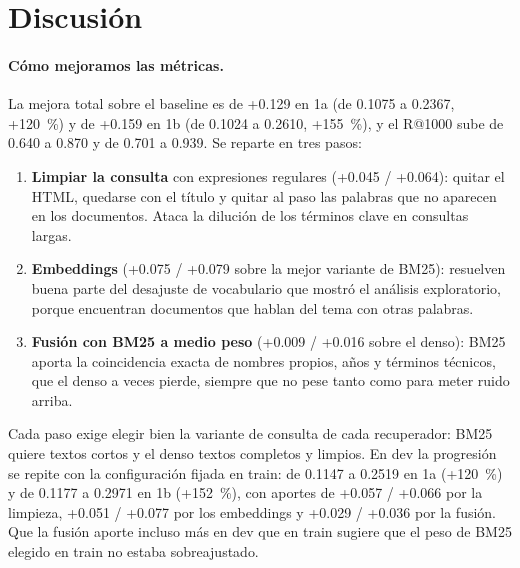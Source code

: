 \documentclass[11pt,a4paper]{article}
\begin{document}
\section{Discusión}
\label{sec:discusion}

\paragraph{Cómo mejoramos las métricas.} La mejora total sobre el baseline es de +0.129 en 1a (de 0.1075 a 0.2367, +120~\%) y de +0.159 en 1b (de 0.1024 a 0.2610, +155~\%), y el R@1000 sube de 0.640 a 0.870 y de 0.701 a 0.939. Se reparte en tres pasos:
\begin{enumerate}
  \item \textbf{Limpiar la consulta} con expresiones regulares (+0.045 / +0.064): quitar el HTML, quedarse con el título y quitar al paso las palabras que no aparecen en los documentos. Ataca la dilución de los términos clave en consultas largas.
  \item \textbf{Embeddings} (+0.075 / +0.079 sobre la mejor variante de BM25): resuelven buena parte del desajuste de vocabulario que mostró el análisis exploratorio, porque encuentran documentos que hablan del tema con otras palabras.
  \item \textbf{Fusión con BM25 a medio peso} (+0.009 / +0.016 sobre el denso): BM25 aporta la coincidencia exacta de nombres propios, años y términos técnicos, que el denso a veces pierde, siempre que no pese tanto como para meter ruido arriba.
\end{enumerate}
Cada paso exige elegir bien la variante de consulta de cada recuperador: BM25 quiere textos cortos y el denso textos completos y limpios. En dev la progresión se repite con la configuración fijada en train: de 0.1147 a 0.2519 en 1a (+120~\%) y de 0.1177 a 0.2971 en 1b (+152~\%), con aportes de +0.057 / +0.066 por la limpieza, +0.051 / +0.077 por los embeddings y +0.029 / +0.036 por la fusión. Que la fusión aporte incluso más en dev que en train sugiere que el peso de BM25 elegido en train no estaba sobreajustado.
\end{document}
